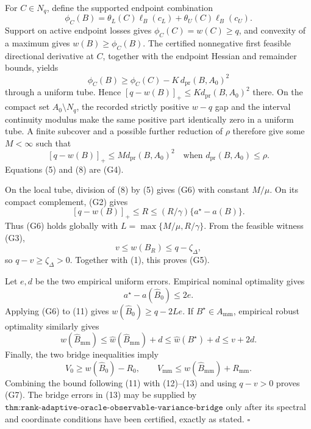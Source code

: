 For \(C\in N_q\), define the supported endpoint combination
\[
\phi_C(B)=\theta_L(C)\ell_B(c_L)+\theta_U(C)\ell_B(c_U).
\tag{6}
\]
Support on active endpoint losses gives \(\phi_C(C)=w(C)\ge q\), and convexity of a maximum gives \(w(B)\ge\phi_C(B)\).  The certified nonnegative first feasible directional derivative at \(C\), together with the endpoint Hessian and remainder bounds, yields
\[
\phi_C(B)\ge\phi_C(C)-K\,d_{\mathrm{pr}}(B,A_0)^2
\tag{7}
\]
through a uniform tube.  Hence \([q-w(B)]_+\le Kd_{\mathrm{pr}}(B,A_0)^2\) there.  On the compact set \(A_0\setminus N_q\), the recorded strictly positive \(w-q\) gap and the interval continuity modulus make the same positive part identically zero in a uniform tube.  A finite subcover and a possible further reduction of \(\rho\) therefore give some \(M<\infty\) such that
\[
[q-w(B)]_+\le M d_{\mathrm{pr}}(B,A_0)^2
\quad\text{when }d_{\mathrm{pr}}(B,A_0)\le\rho.
\tag{8}
\]
Equations (5) and (8) are (G4).

On the local tube, division of (8) by (5) gives (G6) with constant \(M/\mu\).  On its compact complement, (G2) gives
\[
[q-w(B)]_+\le R\le(R/\gamma)\{a^\star-a(B)\}.
\tag{9}
\]
Thus (G6) holds globally with \(L=\max\{M/\mu,R/\gamma\}\).  From the feasible witness (G3),
\[
v\le w(B_R)\le q-\zeta_\Delta,
\tag{10}
\]
so \(q-v\ge\zeta_\Delta>0\).  Together with (1), this proves (G5).

Let \(e,d\) be the two empirical uniform errors.  Empirical nominal optimality gives
\[
a^\star-a(\widehat B_0)\le2e.
\tag{11}
\]
Applying (G6) to (11) gives \(w(\widehat B_0)\ge q-2Le\).  If \(B^\star\in A_{\mathrm{mm}}\), empirical robust optimality similarly gives
\[
w(\widehat B_{\mathrm{mm}})
\le\widehat w(\widehat B_{\mathrm{mm}})+d
\le\widehat w(B^\star)+d
\le v+2d.
\tag{12}
\]
Finally, the two bridge inequalities imply
\[
V_0\ge w(\widehat B_0)-R_0,
\qquad
V_{\mathrm{mm}}\le w(\widehat B_{\mathrm{mm}})+R_{\mathrm{mm}}.
\tag{13}
\]
Combining the bound following (11) with (12)--(13) and using \(q-v>0\) proves (G7).  The bridge errors in (13) may be supplied by \(\texttt{thm:rank-adaptive-oracle-observable-variance-bridge}\) only after its spectral and coordinate conditions have been certified, exactly as stated. \(\square\)